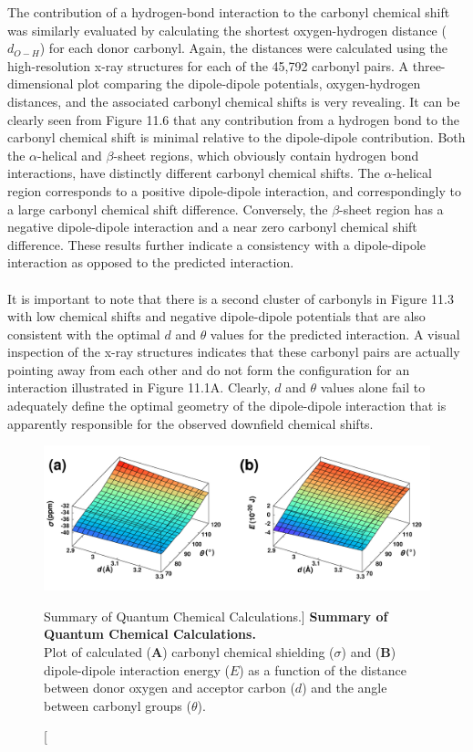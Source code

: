 \begin{doublespace}
The contribution of a hydrogen-bond interaction to the carbonyl \cnmr{}
chemical shift was similarly evaluated by calculating the shortest
oxygen-hydrogen distance ($d_{O-H}$) for each donor carbonyl. Again, the
distances were calculated using the high-resolution x-ray structures for each
of the 45,792 carbonyl pairs. A three-dimensional plot comparing the
dipole-dipole potentials, oxygen-hydrogen distances, and the associated
carbonyl \cnmr{} chemical shifts is very revealing. It can be clearly seen
from Figure 11.6 that any contribution from a hydrogen bond to the \cnmr{}
carbonyl chemical shift is minimal relative to the dipole-dipole contribution.
Both the $\alpha$-helical and $\beta$-sheet regions, which obviously contain
hydrogen bond interactions, have distinctly different \cnmr{} carbonyl chemical
shifts. The $\alpha$-helical region corresponds to a positive dipole-dipole
interaction, and correspondingly to a large carbonyl \cnmr{} chemical shift
difference. Conversely, the $\beta$-sheet region has a negative dipole-dipole
interaction and a near zero carbonyl \cnmr{} chemical shift difference. These
results further indicate a consistency with a dipole-dipole interaction as
opposed to the predicted \npistar{} interaction.
\\\\
It is important to note that there is a second cluster of carbonyls in
Figure 11.3 with low \cnmr{} chemical shifts and negative dipole-dipole
potentials that are also consistent with the optimal $d$ and $\theta$ values
for the predicted \npistar{} interaction. A visual inspection of the x-ray
structures indicates that these carbonyl pairs are actually pointing away from
each other and do not form the configuration for an \npistar{} interaction
illustrated in Figure 11.1A. Clearly, $d$ and $\theta$ values alone fail to
adequately define the optimal geometry of the dipole-dipole interaction that is
apparently responsible for the observed downfield \cnmr{} chemical shifts.
\end{doublespace}

\begin{figure}[h!]
\includegraphics[width=6.5in]{figs/npistar/07-surf-a.png}
\caption
      [Summary of Quantum Chemical Calculations.]{
  {\bf Summary of Quantum Chemical Calculations.}
  \\
  Plot of calculated ({\bf A}) carbonyl \cnmr{} chemical shielding ($\sigma$)
  and ({\bf B}) dipole-dipole interaction energy ($E$) as a function of the
  distance between donor oxygen and acceptor carbon ($d$) and the angle
  between carbonyl groups ($\theta$).
}
\end{figure}

